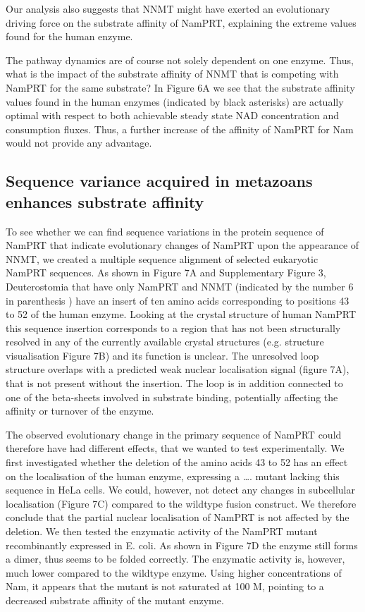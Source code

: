 Our analysis also suggests that NNMT might have exerted an evolutionary driving force on the substrate affinity of NamPRT, explaining the extreme values found for the human enzyme.

The pathway dynamics are of course not solely dependent on one enzyme. Thus, what is the impact of the substrate affinity of NNMT that is competing with NamPRT for the same substrate? In Figure 6A we see that the substrate affinity values found in the human enzymes (indicated by black asterisks) are actually optimal with respect to both achievable steady state NAD concentration and consumption fluxes. Thus, a further increase of the affinity of NamPRT for Nam would not provide any advantage.


\subsection{Sequence variance acquired in metazoans enhances substrate affinity}

To see whether we can find sequence variations in the protein sequence of NamPRT that indicate evolutionary changes of NamPRT upon the appearance of NNMT, we created a multiple sequence alignment of selected eukaryotic NamPRT sequences. As shown in Figure 7A and Supplementary Figure 3, Deuterostomia that have only NamPRT and NNMT (indicated by the number 6 in parenthesis ) have an insert of ten amino acids corresponding to positions 43 to 52 of the human enzyme. Looking at the crystal structure of human NamPRT this sequence insertion corresponds to a region that has not been structurally resolved in any of the currently available crystal structures (e.g. \cite{Wang2006} structure visualisation Figure 7B) and its function is unclear. The unresolved loop structure overlaps with a predicted weak nuclear localisation signal (figure 7A), that is not present without the insertion. The loop is in addition connected to one of the beta-sheets involved in substrate binding, potentially affecting the affinity or turnover of the enzyme.

The observed evolutionary change in the primary sequence of NamPRT could therefore have had different effects, that we wanted to test experimentally. We first investigated whether the deletion of the amino acids 43 to 52 has an effect on the localisation of the human enzyme, expressing a …. mutant lacking this sequence in HeLa cells. We could, however, not detect any changes in subcellular localisation (Figure 7C) compared to the wildtype fusion construct. We therefore conclude that the partial nuclear localisation of NamPRT is not affected by the deletion. We then tested the enzymatic activity of the NamPRT mutant recombinantly expressed in E. coli. As shown in Figure 7D the enzyme still forms a dimer, thus seems to be folded correctly. The enzymatic activity is, however, much lower compared to the wildtype enzyme. Using higher concentrations of Nam, it appears that the mutant is not saturated at 100 \textmu M, pointing to a decreased substrate affinity of the mutant enzyme.